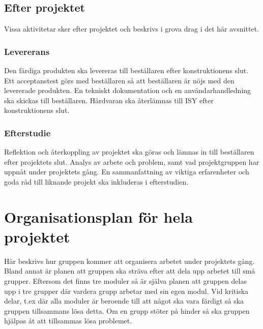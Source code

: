 \documentclass[projektplan/plan.tex]{subfiles}
\begin{document}
\subsection{Efter projektet}
Vissa aktivitetar sker efter projektet och beskrivs i grova drag i det här
avsnittet.
\subsubsection*{Levererans}
Den färdiga produkten ska levereras till beställaren efter konstruktionens
slut. Ett acceptanstest görs med beställaren så att beställaren är nöjs med den
levererade produkten. En tekniskt dokumentation och en användarhandledning ska
skickas till beställaren. Hårdvaran ska återlämnas till ISY efter
konstruktionens slut.
\subsubsection*{Efterstudie}
Reflektion och återkoppling av projektet ska göras och lämnas in till
beställaren efter projektets slut. Analys av arbete och problem, samt vad
projektgruppen har uppnåt under projektets gång. En sammanfattning av viktiga
erfarenheter och goda råd till liknande projekt ska inkluderas i efterstudien.

\section{Organisationsplan för hela projektet}
Här beskrivs hur gruppen kommer att organisera arbetet under projektets gång.
Bland annat är planen att gruppen ska sträva efter att dela upp arbetet till
små grupper. Eftersom det finns tre moduler så är själva planen att gruppen
delas upp i tre grupper där vardera grupp arbetar med sin egen modul. Vid
kritiska delar, t.ex där alla moduler är beroende till att något ska vara
färdigt så ska gruppen tillsammans lösa detta. Om en grupp stöter på hinder
så ska gruppen hjälpas åt att tillsammas lösa problemet.

\newpage
\end{document}
